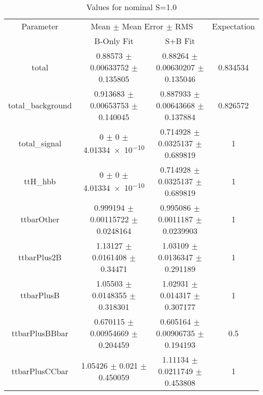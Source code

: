 \begin{table}
\centering
\caption{Values for nominal S=1.0}
\begin{tabular}{cccc}
\toprule
Parameter & \multicolumn{2}{c}{Mean $\pm$ Mean Error $\pm$ RMS} & Expectation\\
 & B-Only Fit & S+B Fit & \\
\midrule
total & \num{0.88573} $\pm$ \num{0.00633752} $\pm$ \num{0.135805} & \num{0.88264} $\pm$ \num{0.00630207} $\pm$ \num{0.135046} & \num{0.834534}\\
total\_background & \num{0.913683} $\pm$ \num{0.00653753} $\pm$ \num{0.140045} & \num{0.887933} $\pm$ \num{0.00643668} $\pm$ \num{0.137884} & \num{0.826572}\\
total\_signal & \num{0} $\pm$ \num{0} $\pm$ \num{4.01334e-10} & \num{0.714928} $\pm$ \num{0.0325137} $\pm$ \num{0.689819} & \num{1}\\
ttH\_hbb & \num{0} $\pm$ \num{0} $\pm$ \num{4.01334e-10} & \num{0.714928} $\pm$ \num{0.0325137} $\pm$ \num{0.689819} & \num{1}\\
ttbarOther & \num{0.999194} $\pm$ \num{0.00115722} $\pm$ \num{0.0248164} & \num{0.995086} $\pm$ \num{0.0011187} $\pm$ \num{0.0239903} & \num{1}\\
ttbarPlus2B & \num{1.13127} $\pm$ \num{0.0161408} $\pm$ \num{0.34471} & \num{1.03109} $\pm$ \num{0.0136347} $\pm$ \num{0.291189} & \num{1}\\
ttbarPlusB & \num{1.05503} $\pm$ \num{0.0148355} $\pm$ \num{0.318301} & \num{1.02931} $\pm$ \num{0.014317} $\pm$ \num{0.307177} & \num{1}\\
ttbarPlusBBbar & \num{0.670115} $\pm$ \num{0.00954669} $\pm$ \num{0.204459} & \num{0.605164} $\pm$ \num{0.00906735} $\pm$ \num{0.194193} & \num{0.5}\\
ttbarPlusCCbar & \num{1.05426} $\pm$ \num{0.021} $\pm$ \num{0.450059} & \num{1.11134} $\pm$ \num{0.0211749} $\pm$ \num{0.453808} & \num{1}\\
\bottomrule
\end{tabular}
\end{table}